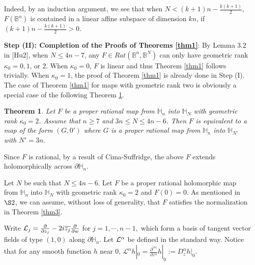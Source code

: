\documentclass[12pt]{article}
\numberwithin{equation}{section}
\def\p{\partial}
\def\a{\alpha}
\def\BB{{\mathbb B}}
\def\HH{{\mathbb H}}
\def\a{\alpha}
\def\a{\alpha}
\def\a{\alpha}
\def\a{\alpha}
\newtheorem{theorem}{Theorem}[section]
\begin{document}
Indeed, by an induction argument, we see that when
$N<(k+1)n-\frac{k(k+1)}{2}$, $F({\BB}^n)$ is contained in a linear
affine subspace of dimension $kn$, if $(k+1)n-\frac{k(k+1)}{2}>0$.


\medskip
{\bf  Step (II):  Completion of the Proofs of Theorems \ref{thm1}}:
{By} Lemma 3.2 in [Hu2], when $N\le 4n-7$, any $F\in
Rat({\BB}^n,{\BB}^{N})$ can only have geometric rank $\kappa_0=0,1$,
{or} $2.$ When $\kappa_0=0$, $F$ is linear and thus Theorem
\ref{thm1} follows trivially. When $\kappa_0=1$, the proof of
Theorem \ref{thm1} is already done in Step (I). The case of Theorem
\ref{thm1} for maps with geometric rank two is obviously a special
case of the following Theorem \ref{thm2}.

\begin{theorem} \label {thm2} Let $F$ be a proper rational map from ${\HH}_n$ into ${\HH}_N$
with geometric rank $\kappa_0=2$. Assume that $n\ge 7$ and $3n\le
N\le 4n-6$. Then $F$ is equivalent to a map of the form $(G,0')$
where $G$ is a proper rational   map from ${\HH}_n$ into
${\HH}_{N'}$ with $N'=3n$.
\end{theorem}

{Since $F$ is rational, by a result of Cima-Suffridge, the above $F$
extends holomorphically across $\p {\HH}_n$.}

\medskip

Let $N$ be such that $N\le 4n-6$. Let $F$ be a proper rational
holomorphic map from ${\HH}_n$ into ${\HH}_N$ with geometric rank
$\kappa_0=2$ and $F(0)=0$.
 As mentioned {in} $\S 2$, we can assume, without loss
of generality, that $F$ satisfies the normalization in Theorem
\ref{thm3}.

Write ${\cal L}_j=\frac{\partial}{\partial
z_j}-2i\overline{z_j}\frac{\partial}{\partial w}$ for $j=1,\cdots,
n-1,$ which form  a basis of tangent vector fields of type $(1,0)$
along $\partial {\HH}_n$. Let ${\cal L}^\a$ be defined in the
standard way. Notice that for any smooth function $h$ near $0$,
$\mathcal{L}^{\a}h|_0=\frac{\p ^{|\a|}}{\p z^\a}h|_0:=D^\a_zh|_0$.
\end{document}
